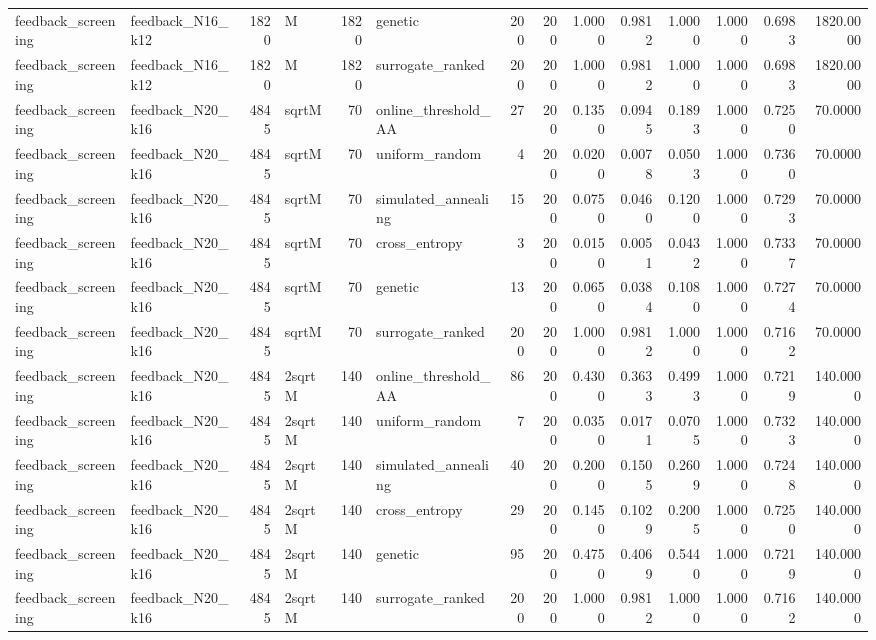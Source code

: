 \begin{tabular}{llrlrlrrrrrrrr}
feedback\_screening & feedback\_N16\_k12 & 1820 & M & 1820 & genetic & 200 & 200 & 1.0000 & 0.9812 & 1.0000 & 1.0000 & 0.6983 & 1820.0000 \\
feedback\_screening & feedback\_N16\_k12 & 1820 & M & 1820 & surrogate\_ranked & 200 & 200 & 1.0000 & 0.9812 & 1.0000 & 1.0000 & 0.6983 & 1820.0000 \\
feedback\_screening & feedback\_N20\_k16 & 4845 & sqrtM & 70 & online\_threshold\_AA & 27 & 200 & 0.1350 & 0.0945 & 0.1893 & 1.0000 & 0.7250 & 70.0000 \\
feedback\_screening & feedback\_N20\_k16 & 4845 & sqrtM & 70 & uniform\_random & 4 & 200 & 0.0200 & 0.0078 & 0.0503 & 1.0000 & 0.7360 & 70.0000 \\
feedback\_screening & feedback\_N20\_k16 & 4845 & sqrtM & 70 & simulated\_annealing & 15 & 200 & 0.0750 & 0.0460 & 0.1200 & 1.0000 & 0.7293 & 70.0000 \\
feedback\_screening & feedback\_N20\_k16 & 4845 & sqrtM & 70 & cross\_entropy & 3 & 200 & 0.0150 & 0.0051 & 0.0432 & 1.0000 & 0.7337 & 70.0000 \\
feedback\_screening & feedback\_N20\_k16 & 4845 & sqrtM & 70 & genetic & 13 & 200 & 0.0650 & 0.0384 & 0.1080 & 1.0000 & 0.7274 & 70.0000 \\
feedback\_screening & feedback\_N20\_k16 & 4845 & sqrtM & 70 & surrogate\_ranked & 200 & 200 & 1.0000 & 0.9812 & 1.0000 & 1.0000 & 0.7162 & 70.0000 \\
feedback\_screening & feedback\_N20\_k16 & 4845 & 2sqrtM & 140 & online\_threshold\_AA & 86 & 200 & 0.4300 & 0.3633 & 0.4993 & 1.0000 & 0.7219 & 140.0000 \\
feedback\_screening & feedback\_N20\_k16 & 4845 & 2sqrtM & 140 & uniform\_random & 7 & 200 & 0.0350 & 0.0171 & 0.0705 & 1.0000 & 0.7323 & 140.0000 \\
feedback\_screening & feedback\_N20\_k16 & 4845 & 2sqrtM & 140 & simulated\_annealing & 40 & 200 & 0.2000 & 0.1505 & 0.2609 & 1.0000 & 0.7248 & 140.0000 \\
feedback\_screening & feedback\_N20\_k16 & 4845 & 2sqrtM & 140 & cross\_entropy & 29 & 200 & 0.1450 & 0.1029 & 0.2005 & 1.0000 & 0.7250 & 140.0000 \\
feedback\_screening & feedback\_N20\_k16 & 4845 & 2sqrtM & 140 & genetic & 95 & 200 & 0.4750 & 0.4069 & 0.5440 & 1.0000 & 0.7219 & 140.0000 \\
feedback\_screening & feedback\_N20\_k16 & 4845 & 2sqrtM & 140 & surrogate\_ranked & 200 & 200 & 1.0000 & 0.9812 & 1.0000 & 1.0000 & 0.7162 & 140.0000 \\

\end{tabular}
